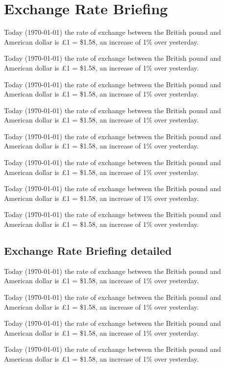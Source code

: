 \documentclass{article}
\begin{document}
\setcounter{tocdepth}{2}
\tableofcontents

\newpage
\section{Exchange Rate Briefing}
Today (\today) the rate of exchange between the British
pound and American dollar is \pounds 1 = \$1.58, an
increase of 1\% over yesterday.

Today (\today) the rate of exchange between the British
pound and American dollar is \pounds 1 = \$1.58, an
increase of 1\% over yesterday.

Today (\today) the rate of exchange between the British
pound and American dollar is \pounds 1 = \$1.58, an
increase of 1\% over yesterday.

Today (\today) the rate of exchange between the British
pound and American dollar is \pounds 1 = \$1.58, an
increase of 1\% over yesterday.

Today (\today) the rate of exchange between the British
pound and American dollar is \pounds 1 = \$1.58, an
increase of 1\% over yesterday.

Today (\today) the rate of exchange between the British
pound and American dollar is \pounds 1 = \$1.58, an
increase of 1\% over yesterday.

Today (\today) the rate of exchange between the British
pound and American dollar is \pounds 1 = \$1.58, an
increase of 1\% over yesterday.

Today (\today) the rate of exchange between the British
pound and American dollar is \pounds 1 = \$1.58, an
increase of 1\% over yesterday.

\subsection{Exchange Rate Briefing detailed}
Today (\today) the rate of exchange between the British
pound and American dollar is \pounds 1 = \$1.58, an
increase of 1\% over yesterday.

Today (\today) the rate of exchange between the British
pound and American dollar is \pounds 1 = \$1.58, an
increase of 1\% over yesterday.

Today (\today) the rate of exchange between the British
pound and American dollar is \pounds 1 = \$1.58, an
increase of 1\% over yesterday.

Today (\today) the rate of exchange between the British
pound and American dollar is \pounds 1 = \$1.58, an
increase of 1\% over yesterday.
\end{document}
